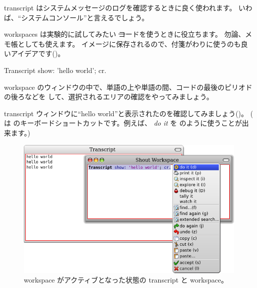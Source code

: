 \documentclass[a4paper,10pt,twoside]{book}
\begin{document}
transcript はシステムメッセージのログを確認するときに良く使われます。
いわば、``システムコンソール''と言えるでしょう。

workspaces は実験的に試してみたい \st コードを使うときに役立ちます。
勿論、メモ帳としても使えます。
イメージに保存されるので、付箋がわりに使うのも良いアイデアです()。

\begin{code}{}
Transcript show: 'hello world'; cr.
\end{code}

workspace のウィンドウの中で、単語の上や単語の間、コードの最後のピリオドの後ろなどを \click して、選択されるエリアの確認をやってみましょう。

transcript ウィンドウに``hello world''と表示されたのを確認してみましょう()。
( は  のキーボードショートカットです。例えば、 \emph{do it} を  のように使うことが出来ます。)

\begin{figure}[htb]
\centerline {\includegraphics[width=\textwidth]{HelloWorld}}
\caption{workspace がアクティブとなった状態の transcript と workspace。}
\end{figure}

\end{document}
